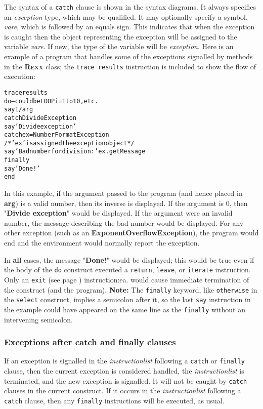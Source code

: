 The syntax of a \texttt{catch} clause is shown in the syntax diagrams.
It always specifies an \emph{exception} type, which may be
qualified.  It may optionally specify a symbol, \emph{vare}, which
is followed by an equals sign.  This indicates that when the exception
is caught then the object representing the exception will be assigned to
the variable \emph{vare}.  If new, the type of the variable will be
\emph{exception}.
 Here is an example of a program that handles some of the exceptions
signalled by methods in the \textbf{R\textsc{exx}} class; the \texttt{trace
results} instruction is included to show the flow of execution:
\begin{alltt}
trace results
do                -- could be LOOP i=1 to 10, etc.
  say 1/arg
catch DivideException
  say 'Divide exception'
catch ex=NumberFormatException
  /* 'ex' is assigned the exception object */
  say 'Bad number for division:' ex.getMessage
finally
  say 'Done!'
end
\end{alltt}
In this example, if the argument passed to the program (and hence
placed in \textbf{arg}) is a valid number, then its inverse is
displayed.  If the argument is 0, then "\textbf{Divide
exception}" would be displayed.  If the argument were an invalid
number, the message describing the bad number would be displayed.
For any other exception (such as an \textbf{ExponentOverflowException}),
the program would end and the environment would normally report the
exception.
 
In \textbf{all} cases, the message "\textbf{Done!}" would be
displayed; this would be true even if the body of the \texttt{do}
construct executed a \texttt{return}, \texttt{leave}, or
\texttt{iterate} instruction.  Only an  \texttt{exit} (see page \pageref{refexit}) 
instruction:ea. would cause immediate termination of the construct (and
the program).
\textbf{Note: }The \texttt{finally} keyword, like \texttt{otherwise} in the
\texttt{select} construct, implies a semicolon after it, so the last
\texttt{say} instruction in the example could have appeared on the same
line as the \texttt{finally} without an intervening semicolon.
\subsubsection{Exceptions after catch and finally clauses}
 
If an exception is signalled in the \emph{instructionlist} following
a \texttt{catch} or \texttt{finally} clause, then the current exception
is considered handled, the \emph{instructionlist} is terminated, and
the new exception is signalled.  It will not be caught by \texttt{catch}
clauses in the current construct.  If it occurs in the
\emph{instructionlist} following a \texttt{catch} clause, then any
\texttt{finally} instructions will be executed, as usual.
 
